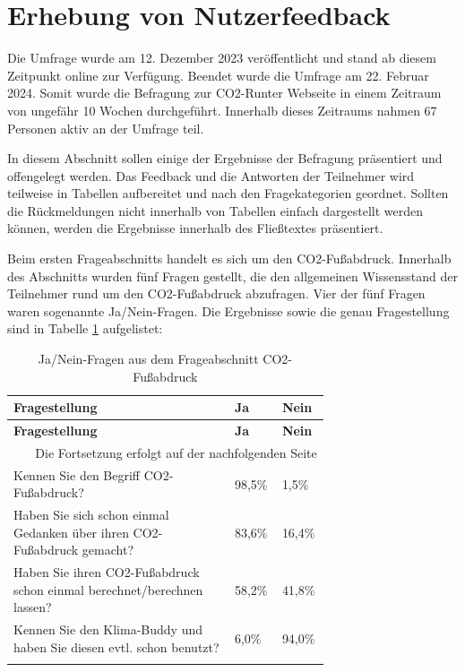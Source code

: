 \section{Erhebung von Nutzerfeedback}

Die Umfrage wurde am 12. Dezember 2023 veröffentlicht und stand ab diesem Zeitpunkt online zur Verfügung.
Beendet wurde die Umfrage am 22. Februar 2024.
Somit wurde die Befragung zur CO2-Runter Webseite in einem Zeitraum von ungefähr 10 Wochen durchgeführt.
Innerhalb dieses Zeitraums nahmen 67 Personen aktiv an der Umfrage teil.

In diesem Abschnitt sollen einige der Ergebnisse der Befragung präsentiert und offengelegt werden.
Das Feedback und die Antworten der Teilnehmer wird teilweise in Tabellen aufbereitet und nach den Fragekategorien geordnet.
Sollten die Rückmeldungen nicht innerhalb von Tabellen einfach dargestellt werden können, werden die Ergebnisse innerhalb des Fließtextes präsentiert.

Beim ersten Frageabschnitts handelt es sich um den CO2-Fußabdruck.
Innerhalb des Abschnitts wurden fünf Fragen gestellt, die den allgemeinen Wissensstand der Teilnehmer rund um den CO2-Fußabdruck abzufragen.
Vier der fünf Fragen waren sogenannte Ja/Nein-Fragen.
Die Ergebnisse sowie die genau Fragestellung sind in Tabelle \ref{co2fußabdruckfragen} aufgelistet: \newline

\begin{longtable}{|p{0.7\linewidth}|l|l|}
    \hline
    \textbf{Fragestellung}                                                  & \textbf{Ja} & \textbf{Nein} \\ \hline
    \endfirsthead

    \hline
    \textbf{Fragestellung}                                                  & \textbf{Ja} & \textbf{Nein} \\ \hline
    \endhead

    \hline
    \multicolumn{3}{|r|}{{Die Fortsetzung erfolgt auf der nachfolgenden Seite}}                           \\
    \hline
    \endfoot

    \endlastfoot

    Kennen Sie den Begriff CO2-Fußabdruck?                                  & 98,5\%      & 1,5\%         \\ \hline
    Haben Sie sich schon einmal Gedanken über ihren CO2-Fußabdruck gemacht? & 83,6\%      & 16,4\%        \\ \hline
    Haben Sie ihren CO2-Fußabdruck schon einmal berechnet/berechnen lassen? & 58,2\%      & 41,8\%        \\ \hline
    Kennen Sie den Klima-Buddy und haben Sie diesen evtl. schon benutzt?    & 6,0\%       & 94,0\%        \\ \hline
    \caption{Ja/Nein-Fragen aus dem Frageabschnitt CO2-Fußabdruck}
    \label{co2fußabdruckfragen}
    \\
\end{longtable}

